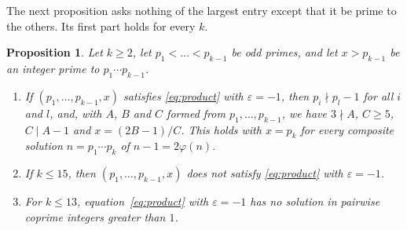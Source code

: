 \documentclass[11pt,reqno]{amsart}
\numberwithin{equation}{section}
\theoremstyle{plain}
\newtheorem{proposition}[theorem]{Proposition}
\theoremstyle{definition}
\theoremstyle{remark}
\begin{document}
The next proposition asks nothing of the largest entry except that it
be prime to the others. Its first part holds for every $k$.

\begin{proposition}\label{prop:largest}
Let $k\ge2$, let $p_1<\dots<p_{k-1}$ be odd primes, and let $x>p_{k-1}$
be an integer prime to $p_1\cdots p_{k-1}$.
\begin{enumerate}[label=\textup{(\roman*)}]
\item If $(p_1,\dots,p_{k-1},x)$ satisfies \eqref{eq:product} with
$\varepsilon=-1$, then $p_i\nmid p_l-1$ for all $i$ and $l$, and, with
$A$, $B$ and $C$ formed from $p_1,\dots,p_{k-1}$, we have $3\nmid A$,
$C\ge5$, $C\mid A-1$ and $x=(2B-1)/C$. This holds with $x=p_k$ for
every composite solution $n=p_1\cdots p_k$ of $n-1=2\varphi(n)$.
\item If $k\le15$, then $(p_1,\dots,p_{k-1},x)$ does not satisfy
\eqref{eq:product} with $\varepsilon=-1$.
\item For $k\le13$, equation~\eqref{eq:product} with $\varepsilon=-1$
has no solution in pairwise coprime integers greater than $1$.
\end{enumerate}
\end{proposition}
\end{document}
